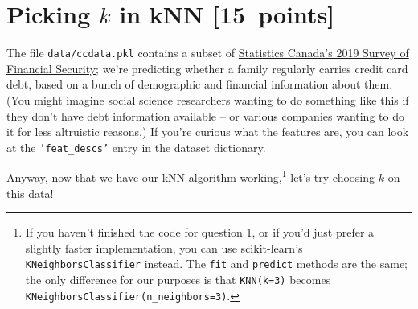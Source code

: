 \documentclass{article}
\newcommand\pts[1]{\textcolor{pointscolour}{[#1~points]}}
\begin{document}
    \clearpage
    \section{Picking $k$ in kNN \pts{15}}
    The file \texttt{data/ccdata.pkl} contains a subset of \href{https://www23.statcan.gc.ca/imdb/p2SV.pl?Function=getSurvey&SDDS=2620}{Statistics Canada's 2019 Survey of Financial Security}; we're predicting whether a family regularly carries credit card debt, based on a bunch of demographic and financial information about them. (You might imagine social science researchers wanting to do something like this if they don't have debt information available -- or various companies wanting to do it for less altruistic reasons.) If you're curious what the features are, you can look at the \texttt{'feat\_descs'} entry in the dataset dictionary.

    Anyway, now that we have our kNN algorithm working,\footnote{If you haven't finished the code for question 1, or if you'd just prefer a slightly faster implementation, you can use scikit-learn's \texttt{KNeighborsClassifier} instead. The \texttt{fit} and \texttt{predict} methods are the same; the only difference for our purposes is that \texttt{KNN(k=3)} becomes \texttt{KNeighborsClassifier(n\_neighbors=3)}.} let's try choosing $k$ on this data!
\end{document}
